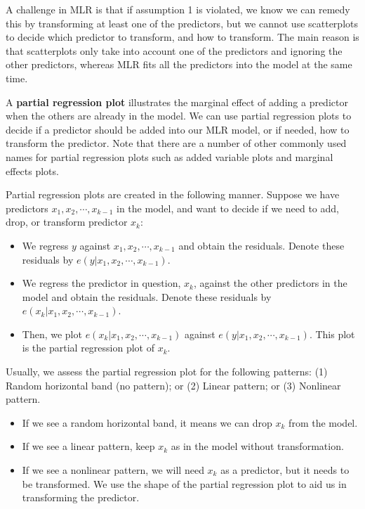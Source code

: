 \documentclass[
]{book}
\providecommand{\tightlist}{%
  \setlength{\itemsep}{0pt}\setlength{\parskip}{0pt}}
\begin{document}
A challenge in MLR is that if assumption 1 is violated, we know we can remedy this by transforming at least one of the predictors, but we cannot use scatterplots to decide which predictor to transform, and how to transform. The main reason is that scatterplots only take into account one of the predictors and ignoring the other predictors, whereas MLR fits all the predictors into the model at the same time.

A \textbf{partial regression plot} illustrates the marginal effect of adding a predictor when the others are already in the model. We can use partial regression plots to decide if a predictor should be added into our MLR model, or if needed, how to transform the predictor. Note that there are a number of other commonly used names for partial regression plots such as added variable plots and marginal effects plots.

Partial regression plots are created in the following manner. Suppose we have predictors \(x_1, x_2, \cdots, x_{k-1}\) in the model, and want to decide if we need to add, drop, or transform predictor \(x_k\):

\begin{itemize}
\tightlist
\item
  We regress \(y\) against \(x_1, x_2, \cdots, x_{k-1}\) and obtain the residuals. Denote these residuals by \(e(y|x_1, x_2, \cdots, x_{k-1})\).
\item
  We regress the predictor in question, \(x_k\), against the other predictors in the model and obtain the residuals. Denote these residuals by \(e(x_k|x_1, x_2, \cdots, x_{k-1})\).
\item
  Then, we plot \(e(x_k|x_1, x_2, \cdots, x_{k-1})\) against \(e(y|x_1, x_2, \cdots, x_{k-1})\). This plot is the partial regression plot of \(x_k\).
\end{itemize}

Usually, we assess the partial regression plot for the following patterns: (1) Random horizontal band (no pattern); or (2) Linear pattern; or (3) Nonlinear pattern.

\begin{itemize}
\tightlist
\item
  If we see a random horizontal band, it means we can drop \(x_k\) from the model.
\item
  If we see a linear pattern, keep \(x_k\) as in the model without transformation.
\item
  If we see a nonlinear pattern, we will need \(x_k\) as a predictor, but it needs to be transformed. We use the shape of the partial regression plot to aid us in transforming the predictor.
\end{itemize}
\end{document}
